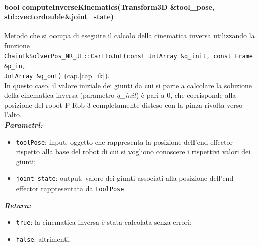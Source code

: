 \paragraph{bool computeInverseKinematics(Transform3D \&tool\_pose, std::vector\tl double\tr \&joint\_state)}
Metodo che si occupa di eseguire il calcolo della cinematica inversa utilizzando la funzione \\ \texttt{ChainIkSolverPos\_NR\_JL::CartToJnt(const JntArray \&q\_init, const Frame \&p\_in, \\ JntArray \&q\_out)} (cap.\ref{cap_ik}). \\In questo caso, il valore iniziale dei giunti da cui si parte a calcolare la soluzione della cinematica inversa (parametro \textit{q\_init}) è pari a 0, che corrisponde alla posizione del robot P-Rob 3 completamente disteso con la pinza rivolta verso l'alto.\\
\textbf{\textit{Parametri:}}
\begin{itemize}
	\item \texttt{toolPose}: input, oggetto che rappresenta la posizione dell'end-effector rispetto alla base del robot di cui si vogliono conoscere i rispettivi valori dei giunti;
	\item \texttt{joint\_state}: output, valore dei giunti associati alla posizione dell'end-effector rappresentata da \texttt{toolPose}.
\end{itemize}
\textbf{\textit{Return:}}
\begin{itemize}
	\item \texttt{true}: la cinematica inversa è stata calcolata senza errori;
	\item \texttt{false}: altrimenti.
\end{itemize}

